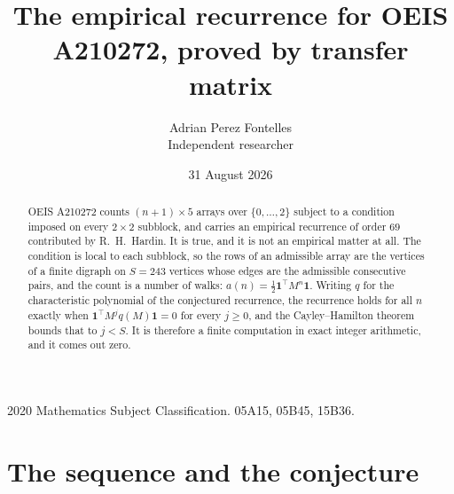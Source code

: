 \documentclass[11pt,a4paper]{article}
\title{The empirical recurrence for OEIS A210272, proved by transfer matrix}
\author{Adrian Perez Fontelles\\ \small Independent researcher}
\date{31 August 2026}
\theoremstyle{plain}
\theoremstyle{definition}
\begin{document}
\maketitle

\begin{abstract}
OEIS A210272 counts $(n+1)\times5$ arrays over $\{0,\dots,2\}$ subject to a condition imposed on
every $2\times2$ subblock, and carries an empirical recurrence of order $69$ contributed
by R.~H.~Hardin. It is true, and it is not an empirical matter at all. The condition is local
to each subblock, so the rows of an admissible array are the vertices of a finite digraph
on $S=243$ vertices whose edges are the admissible consecutive pairs, and the count is a
number of walks: $a(n)=\tfrac1{2}\mathbf{1}^{\!\top}M^{n}\mathbf{1}$. Writing $q$
for the characteristic polynomial of the conjectured recurrence, the recurrence holds for all
$n$ exactly when $\mathbf{1}^{\!\top}M^{j}q(M)\mathbf{1}=0$ for every $j\ge0$, and the
Cayley--Hamilton theorem bounds that to $j<S$. It is therefore a finite computation in exact
integer arithmetic, and it comes out zero.
\end{abstract}

\noindent\small 2020 Mathematics Subject Classification. 05A15, 05B45, 15B36.\normalsize

\section{The sequence and the conjecture}
\end{document}
